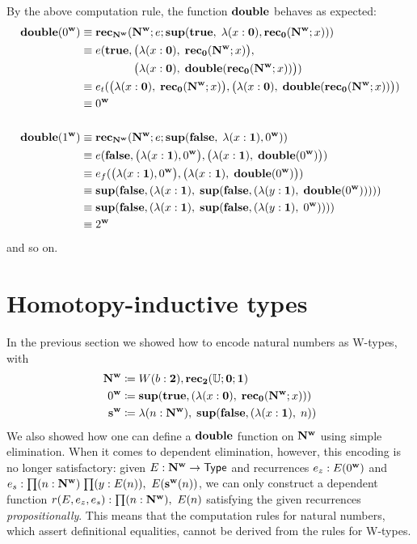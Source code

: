 By the above computation rule, the function $\mathbf{double}$ behaves as expected:
\begin{align*}
\mathbf{double}(0^\mathbf{w}) & \equiv \mathbf{rec}_\mathbf{N^w}(\mathbf{N^w}; e; \mathbf{sup}(\mathbf{true}, \; \lambda(x : \mathbf{0}), \mathbf{rec}_\mathbf{0}(\mathbf{N^w};x))) \\
& \equiv e(\mathbf{true}, \big(\lambda(x : \mathbf{0}), \; \mathbf{rec}_\mathbf{0}(\mathbf{N^w};x)\big), \\
 & \;\;\;\;\;\;\;\;\;\;\;\;\;\;\;\;\; \big(\lambda(x : \mathbf{0}), \; \mathbf{double}(\mathbf{rec}_\mathbf{0}(\mathbf{N^w};x))\big)) \\
 & \equiv e_t(\big(\lambda(x : \mathbf{0}), \; \mathbf{rec}_\mathbf{0}(\mathbf{N^w};x)\big), \big(\lambda(x : \mathbf{0}), \; \mathbf{double}(\mathbf{rec}_\mathbf{0}(\mathbf{N^w};x))\big)) \\
 & \equiv 0^\mathbf{w} \\
 \\
\mathbf{double}(1^\mathbf{w}) & \equiv \mathbf{rec}_\mathbf{N^w}(\mathbf{N^w}; e; \mathbf{sup}(\mathbf{false}, \; \lambda(x : \mathbf{1}), 0^\mathbf{w})) \\
& \equiv e(\mathbf{false}, \big(\lambda(x : \mathbf{1}), 0^\mathbf{w}\big), \big(\lambda(x : \mathbf{1}), \; \mathbf{double}(0^\mathbf{w})\big)) \\
 & \equiv e_f(\big(\lambda(x : \mathbf{1}), 0^\mathbf{w}\big), \big(\lambda(x : \mathbf{1}), \; \mathbf{double}(0^\mathbf{w})\big)) \\
 & \equiv \mathbf{sup}(\mathbf{false}, (\lambda (x:\mathbf{1}), \; \mathbf{sup}(\mathbf{false},(\lambda (y : \mathbf{1}), \; \mathbf{double}(0^\mathbf{w}))))) \\
 & \equiv \mathbf{sup}(\mathbf{false}, (\lambda (x:\mathbf{1}), \; \mathbf{sup}(\mathbf{false},(\lambda (y : \mathbf{1}), \; 0^\mathbf{w})))) \\
 & \equiv 2^\mathbf{w}
\end{align*}
and so on.


\section{Homotopy-inductive types}
In the previous section we showed how to encode natural numbers as W-types, with 
\begin{align*}
\mathbf{N^w} & \coloneqq W(b:\mathbf{2}), \mathbf{rec}_\mathbf{2}(\mathbb{U};\mathbf{0};\mathbf{1}) \\
0^\mathbf{w} & \coloneqq \mathbf{sup}(\mathbf{true}, (\lambda (x : \mathbf{0}), \; \mathbf{rec}_\mathbf{0}(\mathbf{N^w};x))) \\
\mathbf{s^w} & \coloneqq \lambda (n : \mathbf{N^w}), \; \mathbf{sup}(\mathbf{false}, (\lambda (x : \mathbf{1}), \; n))
\end{align*}
We also showed how one can define a $\mathbf{double}$ function on $\mathbf{N^w}$ using simple elimination. When it comes to dependent elimination, however, this encoding is no longer satisfactory: given $E : \mathbf{N^w} \to \mathsf{Type}$ and recurrences $e_z : E(0^\mathbf{w})$ and $e_s : \prd{n : \natw}{y : E(n)} E(\sw(n))$, we can only construct a dependent function $r(E,e_z,e_s) : \prd{n : \natw} E(n)$ satisfying the given recurrences \emph{propositionally}. This means that the computation rules for natural numbers, which assert definitional equalities, cannot be derived from the rules for W-types.

